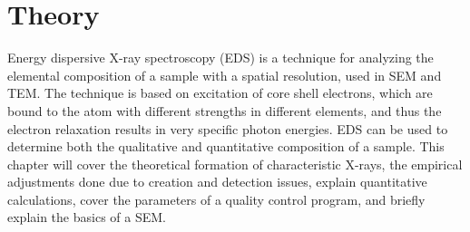 \chapter{Theory}
\label{chap:theory}










Energy dispersive X-ray spectroscopy (EDS) is a technique for analyzing the elemental composition of a sample with a spatial resolution, used in SEM and TEM.
The technique is based on excitation of core shell electrons, which are bound to the atom with different strengths in different elements, and thus the electron relaxation results in very specific photon energies.
EDS can be used to determine both the qualitative and quantitative composition of a sample.
This chapter will cover the theoretical formation of characteristic X-rays, the empirical adjustments done due to creation and detection issues, explain quantitative calculations, cover the parameters of a quality control program, and briefly explain the basics of a SEM.

